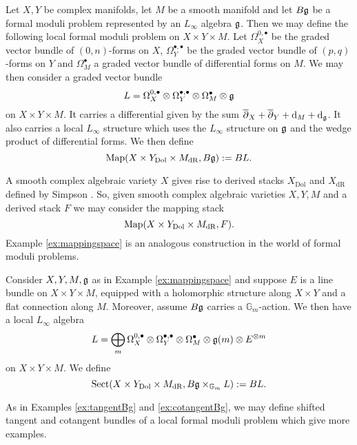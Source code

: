 \documentclass[10pt, oneside]{article}
\newcommand{\Gm}{\mathbb{G}_m}
\newcommand{\Sect}{\mathrm{Sect}}
\begin{document}
\begin{example}
Let $X,Y$ be complex manifolds, let $M$ be a smooth manifold and let $B\mathfrak g$ be a formal moduli problem represented by an $L_\infty$ algebra $\mathfrak g$. Then we may define the following local formal moduli problem on $X\times Y\times M$. Let $\Omega^{0, \bullet}_X$ be the graded vector bundle of $(0, n)$-forms on $X$, $\Omega^{\bullet, \bullet}_Y$ be the graded vector bundle of $(p, q)$-forms on $Y$ and $\Omega^\bullet_M$ a graded vector bundle of differential forms on $M$. We may then consider a graded vector bundle
\[L = \Omega^{0,\bullet}_X\otimes \Omega^{\bullet, \bullet}_Y\otimes \Omega^\bullet_M\otimes \mathfrak g\]
on $X\times Y\times M$. It carries a differential given by the sum $\overline{\partial}_X + \overline{\partial}_Y + {\rm d}_M + {\rm d}_\mathfrak g$. It also carries a local $L_\infty$ structure which uses the $L_\infty$ structure on $\mathfrak g$ and the wedge product of differential forms. We then define
\[\operatorname{Map}(X\times Y_{\mathrm{Dol}}\times M_{\mathrm{dR}}, B\mathfrak g) := B L.\]
\label{ex:mappingspace}
\end{example}

\begin{remark}
A smooth complex algebraic variety $X$ gives rise to derived stacks $X_{\mathrm{Dol}}$ and $X_{\mathrm{dR}}$ defined by Simpson \cite{Simpson,PTVV}. So, given smooth complex algebraic varieties $X,Y,M$ and a derived stack $F$ we may consider the mapping stack
\[\operatorname{Map}(X\times Y_{\mathrm{Dol}}\times M_{\mathrm{dR}}, F).\]
Example \ref{ex:mappingspace} is an analogous construction in the world of formal moduli problems.
\end{remark}

\begin{example}
Consider $X, Y, M, \mathfrak g$ as in Example \ref{ex:mappingspace} and suppose $E$ is a line bundle on $X\times Y\times M$, equipped with a holomorphic structure along $X\times Y$ and a flat connection along $M$. Moreover, assume $B\mathfrak g$ carries a $\Gm$-action. We then have a local $L_\infty$ algebra
\[L = \bigoplus_m \Omega^{0,\bullet}_X\otimes \Omega^{\bullet, \bullet}_Y\otimes \Omega^\bullet_M\otimes \mathfrak g(m)\otimes E^{\otimes m}\]
on $X\times Y\times M$. We define
\[\Sect(X\times Y_{\mathrm{Dol}}\times M_{\mathrm{dR}}, B\fg\times_{\Gm} L) := B L.\]
\end{example}

As in Examples \ref{ex:tangentBg} and \ref{ex:cotangentBg}, we may define shifted tangent and cotangent bundles of a local formal moduli problem which give more examples.
\end{document}
